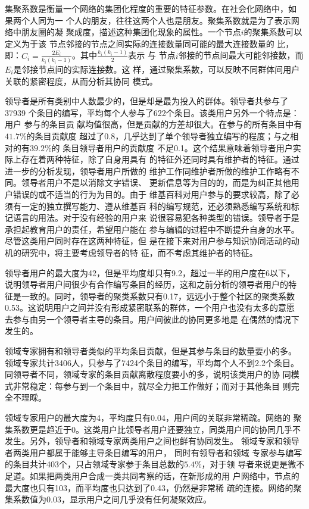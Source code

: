 集聚系数是衡量一个网络的集团化程度的重要的特征参数。在社会化网络中，如
果两个人同为一
个人的朋友，往往这两个人也是朋友。聚集系数就是为了表示网络中朋友圈的凝
聚成度，描述这种集团化现象的属性。一个节点$i$的聚集系数可以定义为于该
节点邻接的节点之间实际的连接数量同可能的最大连接数量的
比，即：$C_i=\frac{2E_i}{k_i(k_i-1)}$。其中$\frac{k_i(k_i-1)}{2}$表示
与
节点$i$邻接的节点间最大可能邻接数，而$E_i$是邻接节点间的实际连接数。这
样，通过聚集系数，可以反映不同群体间用户关联的紧密程度，从而分析其协同
模式。

领导者是所有类别中人数最少的，但是却是最为投入的群体。领导者共参与了37939
个条目的编写，平均每个人参与了622个条目。该类用户另外一个特点是：用户
参与的条目贡
献均值很高，但是贡献的方差却很大。在参与的所有条目中有$41.7\%$的条目贡献度
超过了0.8，几乎达到了单个领导者独立编写的程度；与之相对的有$39.2\%$的
条目领导者用户的贡献度
不足0.1。这个结果意味着领导者用户实际上存在着两种特征，除了自身用具有
的特征外还同时具有维护者的特征。通过进一步的分析发现，领导者用户所做的
维护工作同维护者所做的维护工作略有不同。领导者用户不是以消除文字错误、
更新信息等为目的的，而是为纠正其他用户错误的或不适当的行为为目的。由于
维基百科对用户参与的要求较高，除了必须有一定的独立撰写能力、遵从维基百
科的编写规范，还必须熟悉编写系统和标记语言的用法。对于没有经验的用户来
说很容易犯各种类型的错误。领导者于是承担起教育用户的责任，希望用户能在
参与编辑的过程中不断提升自身的水平。尽管这类用户同时存在这两种特征，但
是在接下来对用户参与知识协同活动的动机的研究中，将主要考虑领导者的特
征，而不考虑其维护者的特征。

领导者用户的最大度为42，但是平均度却只有9.2，超过一半的用户度在6以下，
说明领导者用户间很少有合作编写条目的经历，这和之前分析的领导者用户的特
征是一致的。同时，领导者的聚类系数只有0.17，远远小于整个社区的聚类系数
0.53。这说明用户之间并没有形成紧密联系的群体，一个用户也没有太多的意愿
去参与由另一个领导者主导的条目。用户间彼此的协同更多地是
在偶然的情况下发生的。

领域专家拥有和领导者类似的平均条目贡献，但是其参与条目的数量要小的多。
领域专家共计3406人，只参与了7424个条目的编写，平均每个人不到2.2个条目。
同领导者不同，领域专家的条目贡献离散程度要小的多，说明该类用户的协
同模式非常稳定：每参与到一个条目中，就尽全力把工作做好；而对于其他条目
则完全不理睬。

领域专家用户的最大度为4，平均度只有0.04，用户间的关联非常稀疏。网络的
聚集系数更是趋近于0。这类用户比领导者用户还要独立，同类用户间的协同几乎不
发生。另外，领导者和领域专家两类用户之间也鲜有协同发生。
领域专家和领导者两类用户都属于能够主导条目编写的用户，
同时有领导者和领域
专家参与编写的条目共计403个，只占领域专家参于条目总数的$5.4\%$，对于领
导者来说更是微不足道。如果把两类用户合成一类共同考察的话，在新形成的用
户网络中，节点的最大度也只有103，而平均度也只达到了0.43，仍然是非常稀
疏的连接。网络的聚集系数值为0.03，显示用户之间几乎没有任何凝聚效应。

